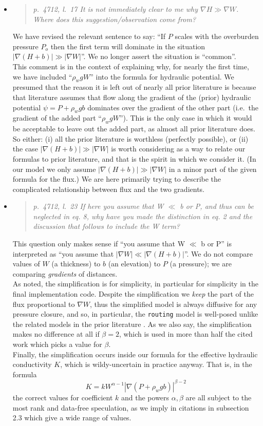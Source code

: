\documentclass[11pt,reqno]{amsart}
\newcommand{\grad}{\nabla}
\newcommand{\reply}[2]{
\medskip\medskip
\item  \begin{quote}
\emph{#1}
\end{quote}

\medskip
\noindent #2}
\begin{document}
\begin{itemize}
\reply{p.~4712, l.~17 It is not immediately clear to me why $\nabla H \gg \nabla W$. Where does this suggestion/observation come from?}
{We have revised the relevant sentence to say: ``If $P$ scales with the overburden pressure $P_o$ then the first term will dominate in the situation $|\nabla (H+b)| \gg |\nabla W|$''.  We no longer assert the situation is ``common''.\\
\indent This comment is in the context of explaining why, for nearly the first time, we have included ``$\rho_w g W$'' into the formula for hydraulic potential.  We presumed that the reason it is left out of nearly all prior literature is because that literature assumes that flow along the gradient of the (prior) hydraulic potential $\psi = P + \rho_w g b$ dominates over the gradient of the other part (i.e.~the gradient of the added part ``$\rho_w g W$'').  This is the only case in which it would be acceptable to leave out the added part, as almost all prior literature does. \\
\indent So either: (i) all the prior literature is worthless (perfectly possible), or (ii) the case $|\nabla (H+b)| \gg |\nabla W|$ is worth considering as a way to relate our formulas to prior literature, and that is the spirit in which we consider it.  (In our model we only assume $|\nabla (H+b)| \gg |\nabla W|$ in a minor part of the given formula for the flux.)  We are here primarily trying to describe the complicated relationship between flux and the two gradients.}

\reply{p.~4712, l.~23 If here you assume that W $\ll$ b or P, and thus can be neglected in eq. 8, why have you made the distinction in eq. 2 and the discussion that follows to include the W term?}
{This question only makes sense if ``you assume that W $\ll$ b or P'' is interpreted as ``you assume that $|\nabla W| \ll |\nabla (H+b)|$''.  We do not compare values of $W$ (a thickness) to $b$ (an elevation) to $P$ (a pressure); we are comparing \emph{gradients} of distances.\\
\indent As noted, the simplification is for simplicity, in particular for simplicity in the final implementation code.  Despite the simplification we \emph{keep} the part of the flux proportional to $\grad W$, thus the simplified model is always diffusive for any pressure closure, and so, in particular, the \texttt{routing} model is well-posed unlike the related models in the prior literature \cite{LeBrocqetal2009,Siegertetal2009}.  As we also say, the simplification makes no difference at all if $\beta=2$, which is used in more than half the cited work which picks a value for $\beta$.\\
\indent Finally, the simplification occurs inside our formula for the effective hydraulic conductivity $K$, which is wildy-uncertain in practice anyway.  That is, in the formula
  $$K = k W^{\alpha-1} |\grad(P+\rho_w g b)|^{\beta-2}$$
the correct values for coefficient $k$ and the powers $\alpha,\beta$ are all subject to the most rank and data-free speculation, as we imply in citations in subsection 2.3 which give a wide range of values.}


\end{itemize}
\end{document}
